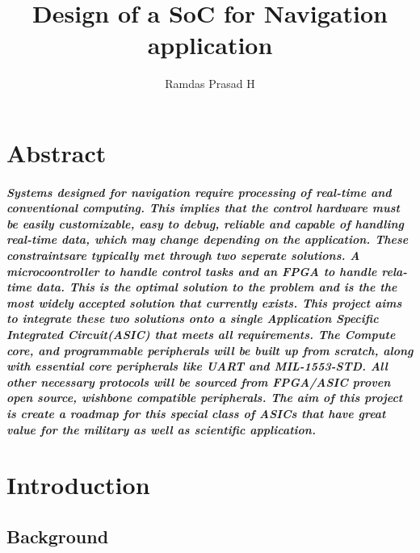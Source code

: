 \documentclass[12pt,a4paper]{report}
\author{Ramdas Prasad H}
\title{Design of a SoC for Navigation application }
\begin{document}
\chapter*{Abstract}
\paragraph{\textrm{\textmd{Systems designed for navigation require processing of real-time and conventional computing. This implies that the control hardware must be easily customizable, easy to debug, reliable and capable of handling real-time data, which may change depending on the application. These constraintsare typically met through two seperate solutions. A microcoontroller to handle control tasks and an FPGA to handle rela-time data. This is the optimal solution to the problem and is the the most widely accepted solution that currently exists. This project aims to integrate these two solutions onto a single Application Specific Integrated Circuit(ASIC) that meets all requirements. The Compute core, and programmable peripherals will be built up from scratch, along with essential core peripherals like UART and MIL-1553-STD. All other necessary protocols will be sourced from FPGA/ASIC proven open source, wishbone compatible peripherals. The aim of this project is create a roadmap for this special class of ASICs that have great value for the military as well as scientific application.}}}
\tableofcontents
\listoffigures
{}
\listoftables
{}

\chapter{Introduction}
\section{Background}
\end{document}
